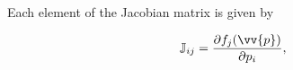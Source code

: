 Each element of the Jacobian matrix is given by

\begin{equation}
\mathbb{J}_{ij} =
    \dfrac{\partial f_j(\vv{p})}{\partial p_i},
\label{eq:jacobian_element}
\end{equation}








